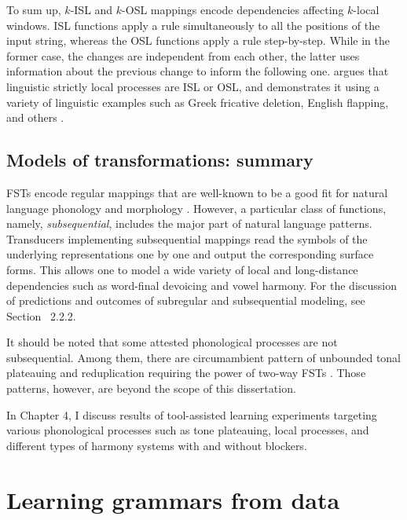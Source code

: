 To sum up, $k$-ISL and $k$-OSL mappings encode dependencies affecting $k$-local windows.
ISL functions apply a rule simultaneously to all the positions of the input string, whereas the OSL functions apply a rule step-by-step.
While in the former case, the changes are independent from each other, the latter uses information about the previous change to inform the following one.
\cite{Chandlee2014} argues that linguistic strictly local processes are ISL or OSL, and demonstrates it using a variety of linguistic examples such as Greek fricative deletion, English flapping, and others \citep{JosephPhilippakiWarburton1987}.




\subsection{Models of transformations: summary}


FSTs encode regular mappings that are well-known to be a good fit for natural language phonology and morphology \citep{Johnson1972,KaplanKay94,BeesleyKartunnen03}.
However, a particular class of functions, namely, \emph{subsequential}, includes the major part of natural language patterns.
Transducers implementing subsequential mappings read the symbols of the underlying representations one by one and output the corresponding surface forms.
This allows one to model a wide variety of local and long-distance dependencies such as word-final devoicing and vowel harmony.
For the discussion of predictions and outcomes of subregular and subsequential modeling, see Section~ 2.2.2.

It should be noted that some attested phonological processes are not subsequential.
Among them, there are circumambient pattern of unbounded tonal plateauing and reduplication requiring the power of two-way FSTs \citep{Jardine2016,DolatianHeinz2018}.
Those patterns, however, are beyond the scope of this dissertation.


In Chapter 4, I discuss results of tool-assisted learning experiments targeting various phonological processes such as tone plateauing, local processes, and different types of harmony systems with and without blockers.





\section{Learning grammars from data}
\label{learningframework}


